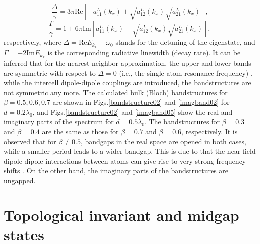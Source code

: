 \documentclass[aps,pra,reprint,groupedaddress,nofootinbib,longbibliography,showpacs]{revtex4-1}
\begin{document}
\begin{equation}\label{deltaeq}
\frac{\Delta}{\gamma}=3\pi\mathrm{Re}\left[-a_{11}^{L}(k_x)\pm\sqrt{a_{12}^{L}(k_x)}\sqrt{a_{21}^{L}(k_x)}\right],
\end{equation} 
\begin{equation}\label{gammaeq}
\frac{\Gamma}{\gamma}=1+6\pi\mathrm{Im}\left[a_{11}^{L}(k_x)\mp\sqrt{a_{12}^{L}(k_x)}\sqrt{a_{21}^{L}(k_x)}\right],
\end{equation} 
respectively, where $\Delta=\mathrm{Re}E_{k_x}-\omega_0$ stands for the detuning of the eigenstate, and $\Gamma=-2\mathrm{Im}E_{k_x}$ is the corresponding radiative linewidth (decay rate). It can be inferred that for the nearest-neighbor approximation, the upper and lower bands are symmetric with respect to $\Delta=0$ (i.e., the single atom resonance frequency) \cite{zhangPRB2018}, while the intercell dipole-dipole couplings are introduced, the bandstructures are not symmetric any more. The calculated bulk (Bloch) bandstructures for $\beta=0.5, 0.6, 0.7$ are shown in Figs.\ref{bandstructure02} and \ref{imagband02} for $d=0.2\lambda_0$, and Figs.\ref{bandstructure02} and \ref{imagband05} show the real and imaginary parts of the spectrum for $d=0.5\lambda_0$. The bandstructures for $\beta=0.3$ and $\beta=0.4$ are the same as those for $\beta=0.7$ and $\beta=0.6$, respectively. It is observed that for $\beta\neq0.5$, bandgaps in the real space are opened in both cases, while a smaller period leads to a wider bandgap. This is due to that the near-field dipole-dipole interactions between atoms can give rise to very strong frequency shifts \cite{Schilder2016,wangOE2017}. On the other hand, the imaginary parts of the bandstructures are ungapped.

\section{Topological invariant and midgap states}
\end{document}

